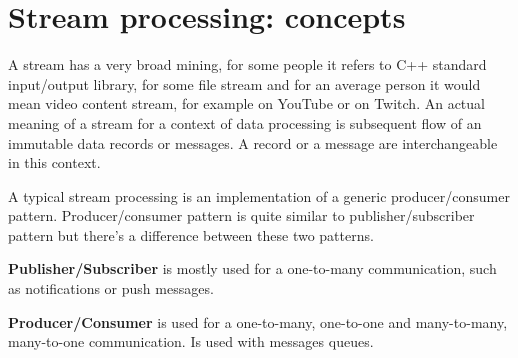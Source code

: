 %
%
%
%
%


\section{Stream processing: concepts}\label{sec:-concepts}
%
%

A stream has a very broad mining, for some people it refers to
C++ standard input/output library, for some file stream and
for an average person it would mean video content stream, for example
on YouTube or on Twitch.
An actual meaning of a stream for a context of data processing
is subsequent flow of an immutable data records or messages.
A record or a message are interchangeable in this context.

A typical stream processing is an implementation of a generic producer/consumer pattern.
Producer/consumer pattern is quite similar to publisher/subscriber pattern but there's
a difference between these two patterns.

\textbf{Publisher/Subscriber} is mostly used for a one-to-many communication,
such as notifications or push messages.

\textbf{Producer/Consumer} is used for a one-to-many, one-to-one and many-to-many,
many-to-one communication.
Is used with messages queues.

